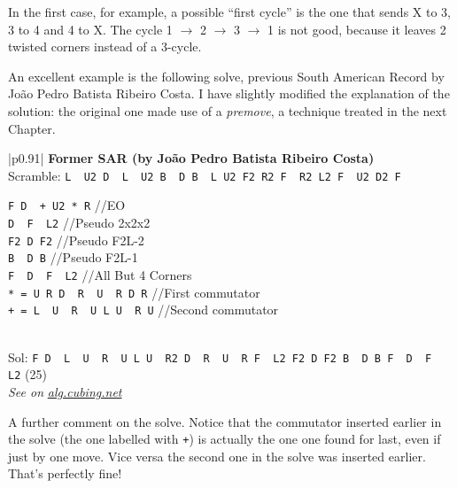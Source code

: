 \documentclass[11pt,a4paper]{book}
\newcommand{\p}{\textquotesingle}
\newcommand{\m}{\texttt}
\newcommand{\ps}{\p\,\,}
\newcommand{\comment}[1]{{\color{gray}\quad//#1}}
\begin{document}
In the first case, for example, a possible ``first cycle'' is the one that sends X to 3, 3 to 4 and 4 to X. The cycle 1 $\to$ 2 $\to$ 3 $\to$ 1 is not good, because it leaves 2 twisted corners instead of a 3-cycle.

An excellent example is the following solve, previous South American Record by Jo\~ao Pedro Batista Ribeiro Costa. I have slightly modified the explanation of the solution: the original one made use of a \emph{premove}, a technique treated in the next Chapter.

\bigskip
\begin{tabular}{|p{}|}
\hline
\textbf{Former SAR (by Jo\~ao Pedro Batista Ribeiro Costa)}\\
\hline
Scramble: \m{L\ps U2 D\ps L\ps U2 B\ps D B\ps L U2 F2 R2 F\ps R2 L2 F\ps U2 D2 F}\\
\hline
\begin{minipage}[l]{0.650\textwidth}
\m{F D\ps + U2 * R} \comment{EO}\\
\m{D\ps F\ps L2} \comment{Pseudo 2x2x2}\\
\m{F2 D F2} \comment{Pseudo F2L-2}\\
\m{B\ps D B} \comment{Pseudo F2L-1}\\
\m{F\ps D\ps F\ps L2} \comment{All But 4 Corners}\\
\m{* = U R D\ps R\ps U\ps R D R\p} \comment{First commutator}\\
\m{+ = L\ps U\ps R\ps U L U\ps R U} \comment{Second commutator}
\end{minipage}
\begin{minipage}[c]{0.25\textwidth}

\end{minipage}\\
\hline
Sol: \m{F D\ps L\ps U\ps R\ps U L U\ps R2 D\ps R\ps U\ps R F\ps L2 F2 D F2 B\ps D B F\ps D\ps F\ps L2} (25)\\
\hline
\emph{See on }\href{https://alg.cubing.net/?alg=F_D-_(L-_U-_R-_U_L_U-_R_U)_U2_(U_R_D-_R-_U-_R_D_R-)_R_\%2F\%2FEO\%0AD-_F-_L2_\%2F\%2F2x2x2\%0AF2_D_F2_\%2F\%2FPseudo_F2L\%26\%2345\%3B2\%0AB-_D_B_\%2F\%2FF2L\%26\%2345\%3B1\%0AF-_D-_F-_\%2F\%2FAll_But_4_Corners&setup=_L_U2_D-_L-_U2_B-_D_B-_L_U2_F2_R2_F-_R2_L2_F-_U2_D2_F}{\emph{alg.cubing.net}}\\
\hline
\end{tabular}
\bigskip

A further comment on the solve. Notice that the commutator inserted earlier in the solve (the one labelled with \m +) is actually the one one found for last, even if just by one move. Vice versa the second one in the solve was inserted earlier. That's perfectly fine!
\end{document}

